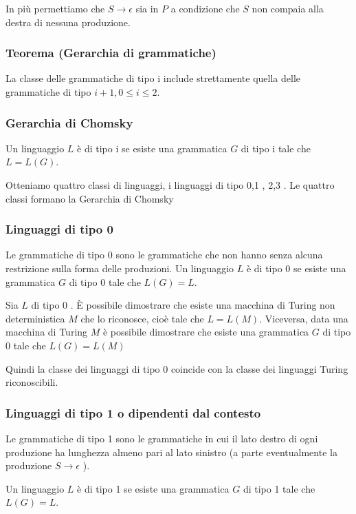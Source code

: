 In più permettiamo che $S \rightarrow \epsilon$ sia in $P$ a condizione che $S$ non compaia alla destra di nessuna produzione.


\subsubsection{Teorema (Gerarchia di grammatiche)}
La classe delle grammatiche di tipo i include strettamente quella delle grammatiche di tipo $i+1,0 \leq i \leq 2$.

\subsubsection{Gerarchia di Chomsky}

Un linguaggio $L$ è di tipo i se esiste una grammatica $G$ di tipo i tale che $L=L(G)$.


Otteniamo quattro classi di linguaggi, i linguaggi di tipo 0,1 , 2,3 . Le quattro classi formano la
Gerarchia di Chomsky

\subsubsection{Linguaggi di tipo 0}

Le grammatiche di tipo 0 sono le grammatiche che non hanno senza alcuna restrizione sulla forma delle produzioni.
Un linguaggio $L$ è di tipo 0 se esiste una grammatica $G$ di tipo 0 tale che $L(G)=L$.

Sia $L$ di tipo 0 . È possibile dimostrare che esiste una macchina di Turing non deterministica $M$ che lo riconosce, cioè tale che $L=L(M)$.
Viceversa, data una macchina di Turing $M$ è possibile dimostrare che esiste una grammatica $G$ di tipo 0 tale che $L(G)=L(M)$

Quindi la classe dei linguaggi di tipo 0 coincide con la classe dei linguaggi Turing riconoscibili.

\subsubsection{Linguaggi di tipo 1 o dipendenti dal contesto}

Le grammatiche di tipo 1 sono le grammatiche in cui il lato destro di ogni produzione ha lunghezza almeno pari al lato sinistro (a parte eventualmente la produzione $S \rightarrow \epsilon$ ).

Un linguaggio $L$ è di tipo 1 se esiste una grammatica $G$ di tipo 1 tale che $L(G)=L$.

